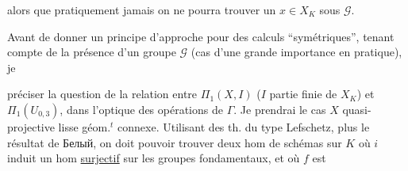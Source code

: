 alors que pratiquement jamais on ne pourra trouver un $x\in X_K$   sous $\mathcal G$.

Avant de donner un principe d'approche pour des calculs ``symétriques'', tenant compte de la présence d'un groupe $\mathcal G$ (cas d'une grande importance en pratique), je  préciser la question de la relation entre $\Pi_1(X,I)$ ($I$ partie finie de $X_K$) et $\Pi_1(U_{0,3})$,  dans l'optique des opérations de $\Gamma$.
  Je prendrai le cas $X$ quasi-projective lisse géom.$^t$ connexe. Utilisant des th. du type Lefschetz, plus le résultat de  Белый, on  doit pouvoir trouver deux hom de schémas sur $K$
où $i$ induit un hom \uline{surjectif} sur les groupes fondamentaux, et où $f$ est
